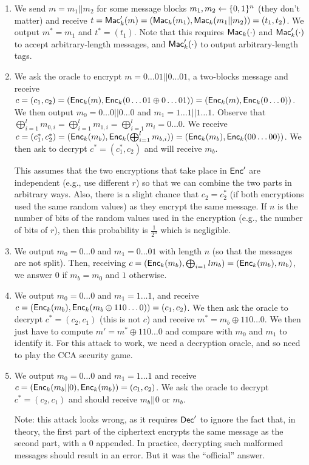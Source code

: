 \begin{solution}
\begin{enumerate}
	\item We send $m=m_1||m_2$ for some message blocks $m_1, m_2 \leftarrow \{0, 1\}^n$ (they don't matter) and receive $t=\operatorname{\mathsf{Mac}}'_k(m)=(\operatorname{\mathsf{Mac}}_k(m_1), \operatorname{\mathsf{Mac}}_k(m_1||m_2))=(t_1, t_2)$. We output $m^*=m_1$ and $t^*=(t_1)$. Note that this requires $\operatorname{\mathsf{Mac}}_k(\cdot)$ and $\operatorname{\mathsf{Mac}}'_k(\cdot)$ to accept arbitrary-length messages, and $\operatorname{\mathsf{Mac}}'_k(\cdot)$ to output arbitrary-length tags.

	\item We ask the oracle to encrypt $m=0\dots01 || 0\dots01$, a two-blocks message and receive $c=(c_1, c_2)=(\operatorname{\mathsf{Enc}}_k(m), \operatorname{\mathsf{Enc}}_k(0\dots01 \oplus 0\dots01))=(\operatorname{\mathsf{Enc}}_k(m), \operatorname{\mathsf{Enc}}_k(0\dots0))$.
	We then output $m_0=0\dots0||0\dots0$ and $m_1=1\dots1||1\dots1$.
	Observe that $\bigoplus_{i=1}^l m_{0,i} = \bigoplus_{i=1}^l m_{1,i} = \bigoplus_{i=1}^l m_{i}=0\dots0$.
	We receive $c=(c^*_1, c^*_2)=(\operatorname{\mathsf{Enc}}_k(m_b), \operatorname{\mathsf{Enc}}_k(\bigoplus_{i=1}^l m_{b,i}))=(\operatorname{\mathsf{Enc}}_k(m_b), \operatorname{\mathsf{Enc}}_k(00\dots00))$.
	We then ask to decrypt $c^*=(c^*_1, c_2)$ and will receive $m_b$.

	This assumes that the two encryptions that take place in $\operatorname{\mathsf{Enc}}'$ are independent (e.g., use different $r$) so that we can combine the two parts in arbitrary ways.
	Also, there is a slight chance that $c_2=c^*_2$ (if both encryptions used the same random values) as they encrypt the same message. If $n$ is the number of bits of the random values used in the encryption (e.g., the number of bits of $r$), then this probability is $\frac{1}{2^n}$ which is negligible.

	\item We output $m_0=0\dots0$ and $m_1=0\dots01$ with length $n$ (so that the messages are not split). Then, receiving $c=(\operatorname{\mathsf{Enc}}_k(m_b), \bigoplus_{i=1}{l}m_b)=(\operatorname{\mathsf{Enc}}_k(m_b), m_b)$, we answer $0$ if $m_b=m_0$ and $1$ otherwise.

	\item We output $m_0=0\dots0$ and $m_1=1\dots1$, and receive $c=(\operatorname{\mathsf{Enc}}_k(m_b), \operatorname{\mathsf{Enc}}_k(m_b\oplus 110\dots0))=(c_1, c_2)$. We then ask the oracle to decrypt $c^*=(c_2, c_1)$ (this is not $c$) and receive $m^*=m_b\oplus 110\dots0$. We then just have to compute $m'=m^*\oplus 110\dots0$ and compare with $m_0$ and $m_1$ to identify it. For this attack to work, we need a decryption oracle, and so need to play the CCA security game.

	\item We output $m_0=0\dots0$ and $m_1=1\dots1$ and receive $c=(\operatorname{\mathsf{Enc}}_k(m_b||0), \operatorname{\mathsf{Enc}}_k(m_b))=(c_1, c_2)$. We ask the oracle to decrypt $c^*=(c_2, c_1)$ and should receive $m_b||0$ or $m_b$.

	Note: this attack looks wrong, as it requires $\operatorname{\mathsf{Dec}}'$ to ignore the fact that, in theory, the first part of the ciphertext encrypts the same message as the second part, with a $0$ appended. In practice, decrypting such malformed messages should result in an error. But it was the ``official'' answer.
	\end{enumerate}
\end{solution}



